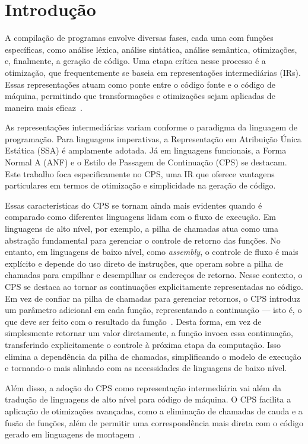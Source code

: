 \chapter{Introdução}\label{sec:introducao}

A compilação de programas envolve diversas fases, cada uma com funções específicas, como análise léxica, análise sintática, análise semântica, otimizações, e, finalmente, a geração de código.
Uma etapa crítica nesse processo é a otimização, que frequentemente se baseia em representações intermediárias (IRs).
Essas representações atuam como ponte entre o código fonte e o código de máquina, permitindo que transformações e otimizações sejam aplicadas de maneira mais eficaz~\cite{plotkin1975call}.

As representações intermediárias variam conforme o paradigma da linguagem de programação.
Para linguagens imperativas, a Representação em Atribuição Única Estática (SSA) é amplamente adotada.
Já em linguagens funcionais, a Forma Normal A (ANF) e o Estilo de Passagem de Continuação (CPS) se destacam.
Este trabalho foca especificamente no CPS, uma IR que oferece vantagens particulares em termos de otimização e simplicidade na geração de código.

Essas características do CPS se tornam ainda mais evidentes quando é comparado como diferentes linguagens lidam com o fluxo de execução.
Em linguagens de alto nível, por exemplo, a pilha de chamadas atua como uma abstração fundamental para gerenciar o controle de retorno das funções.
No entanto, em linguagens de baixo nível, como \textit{assembly}, o controle de fluxo é mais explícito e depende do uso direto de instruções, que operam sobre a pilha de chamadas para empilhar e desempilhar os endereços de retorno.
Nesse contexto, o CPS se destaca ao tornar as continuações explicitamente representadas no código.
Em vez de confiar na pilha de chamadas para gerenciar retornos, o CPS introduz um parâmetro adicional em cada função, representando a continuação {---} isto é, o que deve ser feito com o resultado da função~\cite{kennedy2007continuations}.
Desta forma, em vez de simplesmente retornar um valor diretamente, a função invoca essa continuação, transferindo explicitamente o controle à próxima etapa da computação.
Isso elimina a dependência da pilha de chamadas, simplificando o modelo de execução e tornando-o mais alinhado com as necessidades de linguagens de baixo nível.

Além disso, a adoção do CPS como representação intermediária vai além da tradução de linguagens de alto nível para código de máquina.
O CPS facilita a aplicação de otimizações avançadas, como a eliminação de chamadas de cauda e a fusão de funções, além de permitir uma correspondência mais direta com o código gerado em linguagens de montagem~\cite{flanagan1993essence}.

